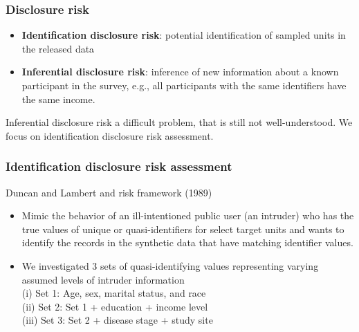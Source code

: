\documentclass[11pt,handout]{beamer}
\begin{document}
\begin{frame}
\frametitle{Disclosure risk}

\begin{itemize}

\item \textbf{Identification disclosure risk}: potential identification of sampled units in the released data

\medskip

\item \textbf{Inferential disclosure risk}: inference of new information about a known participant in the survey, e.g., all participants with the same identifiers have the same income.

\end{itemize}

Inferential disclosure risk a difficult problem, that is still not well-understood.
We focus on identification disclosure risk assessment.  

\end{frame}

\begin{frame}
\frametitle{Identification disclosure risk assessment}

Duncan and Lambert and risk framework (1989)

\begin{itemize}

\item Mimic the behavior of an ill-intentioned public user (an intruder)
who has the true values of unique or quasi-identifiers for select target units and wants to identify the records in the synthetic data that have matching identifier values.

\item We investigated 3 sets of quasi-identifying values representing varying assumed levels of intruder information\\
(i) Set 1: Age, sex, marital status, and race \\
\textcolor{forest}{(ii) Set 2: Set 1 + education + income level} \\
(iii) Set 3: Set 2 + disease stage + study site \\
\end{itemize}

\end{frame}
\end{document}
